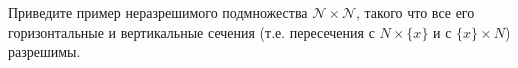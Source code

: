 Приведите пример неразрешимого подмножества $\mathcal{N} \times \mathcal{N}$, такого что все его горизонтальные и
вертикальные сечения (т.е. пересечения с $N \times \{x\}$ и с $\{x\} \times N$) разрешимы.